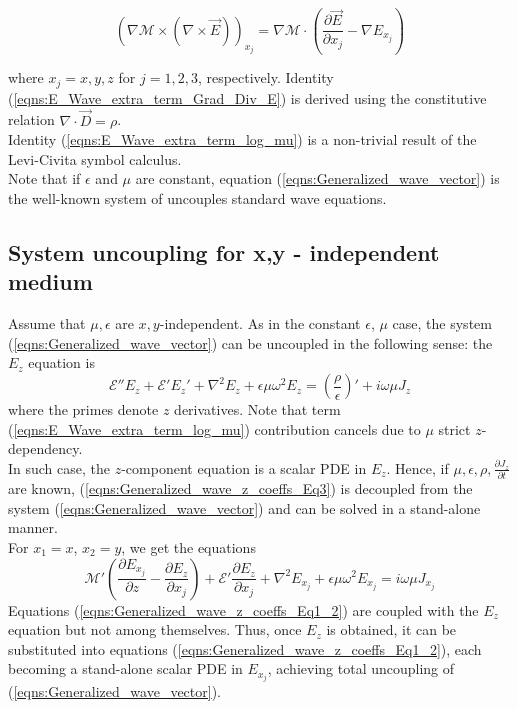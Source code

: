 \documentclass[twocolumn,secnumarabic,amssymb, nobibnotes, aps, prd]{revtex4-1}
\begin{document}
\begin{equation}
\left(\nabla \mathcal{M} \times \left(\nabla \times \overrightarrow{E} \right) \right)_{x_j} = 
\nabla \mathcal{M} \cdot \left( \frac{\partial \overrightarrow{E}}{\partial x_j}- \nabla E_{x_j} \right)
\label{eqns:E_Wave_extra_term_log_mu}
\end{equation}

where $x_j = x,y,z$ for $j=1,2,3$, respectively. Identity (\ref{eqns:E_Wave_extra_term_Grad_Div_E}) is derived using the constitutive relation
$\nabla \cdot \overrightarrow{D} = \rho$. \\
Identity (\ref{eqns:E_Wave_extra_term_log_mu}) is a non-trivial result of the Levi-Civita symbol calculus.\\
Note that if $\epsilon$ and $\mu$ are constant, equation (\ref{eqns:Generalized_wave_vector}) is the well-known system of uncouples standard wave equations.


\subsection{System uncoupling for x,y - independent medium}
Assume that $\mu, \epsilon$ are $x,y$-independent. As in the constant $\epsilon$, $\mu$ case, the system (\ref{eqns:Generalized_wave_vector}) can be uncoupled in the following sense: the $E_z$  equation is
\begin{equation}
\mathcal{E}''{E_z} +\mathcal{E}' E_z' + \nabla^2 {E_z} +\epsilon  \mu \omega^2 E_z = \left( \frac{\rho}{\epsilon}\right)' + i \omega \mu J_z
\label{eqns:Generalized_wave_z_coeffs_Eq3}
\end{equation}
where the primes denote $z$ derivatives. Note that term (\ref{eqns:E_Wave_extra_term_log_mu}) contribution cancels due to $\mu$ strict $z$-dependency. \\ In such case, the $z$-component equation is a scalar PDE in $E_z$. Hence, if $\mu, \epsilon,\rho,\frac{\partial J_z}{\partial t}$ are known, (\ref{eqns:Generalized_wave_z_coeffs_Eq3}) is decoupled from the system (\ref{eqns:Generalized_wave_vector}) and can be solved in a stand-alone manner.\\ 
For $x_1=x$, $x_2=y$, we get the  equations  
\begin{equation}
\mathcal{M}'\left( \frac{\partial E_{x_j}}{\partial z} - \frac{\partial E_z}{\partial {x_j}}\right)+\mathcal{E}'\frac{\partial E_z}{\partial {x_j}}+\nabla^2 E_{x_j} +\epsilon \mu \omega^2 E_{x_j} = i \omega \mu J_{x_j}
\label{eqns:Generalized_wave_z_coeffs_Eq1_2}
\end{equation}
Equations (\ref{eqns:Generalized_wave_z_coeffs_Eq1_2}) are coupled with the $E_z$ equation but not among themselves. Thus, once $E_z$ is obtained, it can be substituted into equations  (\ref{eqns:Generalized_wave_z_coeffs_Eq1_2}), each becoming a stand-alone scalar PDE in $E_{x_j}$, achieving total uncoupling of (\ref{eqns:Generalized_wave_vector}).
\end{document}
